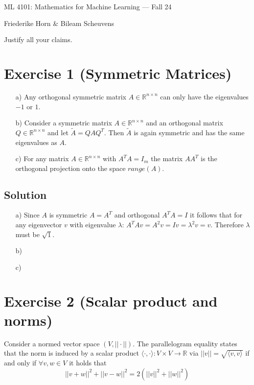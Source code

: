 \documentclass[10pt]{article}
\numberwithin{equation}{section}
\begin{document}
\begin{center}
    \sc ML 4101: Mathematics for Machine Learning --- Fall 24
\end{center}

\noindent Friederike Horn \& Bileam Scheuvens

Justify all your claims.
\section*{Exercise 1 (Symmetric Matrices)}
\begin{enumerate}
\item[a)]{
    Any orthogonal symmetric matrix $A \in \mathbb{R}^{n\times n}$ can only have the eigenvalues $-1$ or $1$.
  }
\item[b)]{
    Consider a symmetric matrix $A \in \mathbb{R}^{n\times n}$ and an orthogonal matrix $Q \in \mathbb{R}^{n\times n}$ and let $\tilde{A} = QAQ^T$. Then $\tilde{A}$ is again symmetric and has the same eigenvalues as $A$.
  }
\item[c)]{
    For any matrix $A \in \mathbb{R}^{n\times n}$ with $A^TA = I_m$ the matrix $AA^T$ is the orthogonal projection onto the space $range(A)$.
  }
\end{enumerate}
\subsection*{Solution}
\begin{enumerate}
\item[a)]{
    Since $A$ is symmetric $A = A^T$ and orthogonal $A^T A = I$ it follows that for any eigenvector $v$ with eigenvalue $\lambda$: $A^T Av = A^2v = Iv = \lambda^2v = v$. Therefore $\lambda$ must be $\sqrt{1}$.
  }
\item[b)]{
    
  }
\item[c)]{
  }
\end{enumerate}

\section*{Exercise 2 (Scalar product and norms)}
Consider a normed vector space $(V, ||\cdot||)$. The parallelogram equality states that the norm is induced by a scalar product $\langle \cdot, \cdot \rangle: V \times V \rightarrow \mathbb{R}$ via $||v|| = \sqrt{\langle v, v \rangle}$ if and only if $\forall v, w \in V$ it holds that
$$ || v + w||^2 + ||v - w||^2 = 2(||v||^2 + ||w||^2)$$
\end{document}
